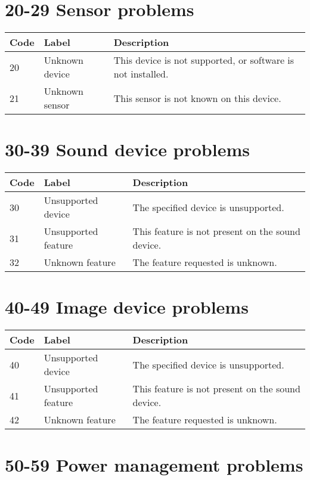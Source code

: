 \documentclass[
]{book}
\begin{document}
\hypertarget{sensor-problems}{%
\section{20-29 Sensor problems}\label{sensor-problems}}

\begin{tabular}{l|l|l}
\hline
Code & Label & Description\\
\hline
20 & Unknown device & This device is not supported, or software is not installed.\\
\hline
21 & Unknown sensor & This sensor is not known on this device.\\
\hline
\end{tabular}

\hypertarget{sound-device-problems}{%
\section{30-39 Sound device problems}\label{sound-device-problems}}

\begin{tabular}{l|l|l}
\hline
Code & Label & Description\\
\hline
30 & Unsupported device & The specified device is unsupported.\\
\hline
31 & Unsupported feature & This feature is not present on the sound device.\\
\hline
32 & Unknown feature & The feature requested is unknown.\\
\hline
\end{tabular}

\hypertarget{image-device-problems}{%
\section{40-49 Image device problems}\label{image-device-problems}}

\begin{tabular}{l|l|l}
\hline
Code & Label & Description\\
\hline
40 & Unsupported device & The specified device is unsupported.\\
\hline
41 & Unsupported feature & This feature is not present on the sound device.\\
\hline
42 & Unknown feature & The feature requested is unknown.\\
\hline
\end{tabular}

\hypertarget{power-management-problems}{%
\section{50-59 Power management problems}\label{power-management-problems}}
\end{document}

